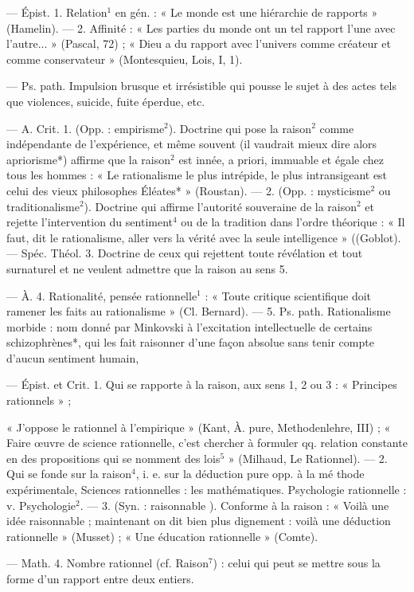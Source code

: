\begin{itemize}[leftmargin=1cm, label=, itemsep=1pt]
 — Épist. 1. Relation$^1$ en
gén. : « Le monde est une hiérarchie
de rapports » (Hamelin). — 2. Affinité : « Les parties du monde ont un
tel rapport l’une avec l’autre... »
(Pascal, 72) ; « Dieu a du rapport
avec l’univers comme créateur et
comme conservateur » (Montesquieu, Lois, I, 1).

 — Ps. path. Impulsion brusque
et irrésistible qui pousse le sujet à
des actes tels que violences, suicide,
fuite éperdue, etc.

 — A. Crit. 1. (Opp. :
empirisme$^2$). Doctrine qui pose la
raison$^2$ comme indépendante de
l'expérience, et même souvent (il
vaudrait mieux dire alors apriorisme*) affirme que la raison$^2$ est
innée, a priori, immuable et égale
chez tous les hommes : « Le rationalisme le plus intrépide, le plus
intransigeant est celui des vieux
philosophes Éléates* » (Roustan). —
2. (Opp. : mysticisme$^2$ ou traditionalisme$^2$). Doctrine qui affirme l’autorité souveraine de la raison$^2$ et rejette l'intervention du sentiment$^4$
ou de la tradition dans l’ordre théorique : « Il faut, dit le rationalisme,
aller vers la vérité avec la seule
intelligence » ((Goblot). — Spéc. Théol.
3. Doctrine de ceux qui rejettent
toute révélation et tout surnaturel
et ne veulent admettre que la raison
au sens 5.

— À. 4. Rationalité, pensée rationnelle$^1$ : « Toute critique scientifique doit ramener les faits au rationalisme » (Cl. Bernard). — 5. Ps.
path. Rationalisme morbide : nom
donné par Minkovski à l'excitation
intellectuelle de certains schizophrènes*, qui les fait raisonner d’une
façon absolue sans tenir compte
d'aucun sentiment humain,

 — Épist. et Crit. 1. Qui se
rapporte à la raison, aux sens 1, 2
ou 3 : « Principes rationnels » ;

« J’oppose le rationnel à l'empirique » (Kant, À. pure, Methodenlehre, III) ; « Faire œuvre de science
rationnelle, c’est chercher à formuler qq. relation constante en des
propositions qui se nomment des
lois$^5$ » (Milhaud, Le Rationnel). —
2. Qui se fonde sur la raison$^4$, i. e.
sur la déduction pure opp. à la mé
thode expérimentale, Sciences rationnelles : les mathématiques. Psychologie rationnelle : v. Psychologie$^2$.
— 3. (Syn. : raisonnable ). Conforme
à la raison : « Voilà une idée raisonnable ; maintenant on dit bien plus
dignement : voilà une déduction
rationnelle » (Musset) ; « Une éducation rationnelle » (Comte).

— Math. 4. Nombre rationnel (cf.
Raison$^7$) : celui qui peut se mettre
sous la forme d’un rapport entre
deux entiers.


\end{itemize}

